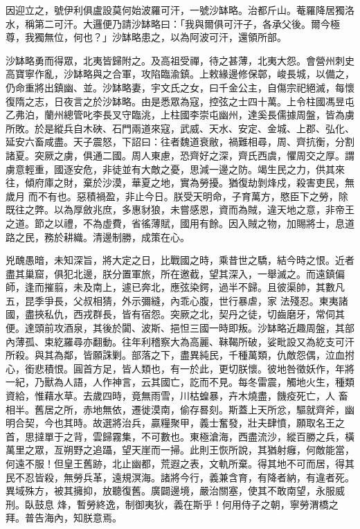\begin{pinyinscope}
 因迎立之，號伊利俱盧設莫何始波羅可汗，一號沙缽略。治都斤山。菴羅降居獨洛水，稱第二可汗。大邏便乃請沙缽略曰：「我與爾俱可汗子，各承父後。爾今極尊，我獨無位，何也？」沙缽略患之，以為阿波可汗，還領所部。



 沙缽略勇而得眾，北夷皆歸附之。及高祖受禪，待之甚薄，北夷大怨。會營州刺史高寶寧作亂，沙缽略與之合軍，攻陷臨渝鎮。上敕緣邊修保鄣，峻長城，以備之，仍命重將出鎮幽、並。沙缽略妻，宇文氏之女，曰千金公主，自傷宗祀絕滅，每懷
 復隋之志，日夜言之於沙缽略。由是悉眾為寇，控弦之士四十萬。上令柱國馮昱屯乙弗泊，蘭州總管叱李長叉守臨洮，上柱國李崇屯幽州，達奚長儒據周盤，皆為虜所敗。於是縱兵自木硤、石門兩道來寇，武威、天水、安定、金城、上郡、弘化、延安六畜咸盡。天子震怒，下詔曰：往者魏道衰敝，禍難相尋，周、齊抗衡，分割諸夏。突厥之虜，俱通二國。周人東慮，恐齊好之深，齊氏西虞，懼周交之厚。謂虜意輕重，國逐安危，非徒並有大敵之憂，思減一邊之防。竭生民之力，供其來往，傾府庫之財，棄於沙漠，華夏之地，實為勞擾。猶復劫剝烽戍，殺害吏民，無歲月
 而不有也。惡積禍盈，非止今日。朕受天明命，子育萬方，愍臣下之勞，除既往之弊。以為厚斂兆庶，多惠豺狼，未嘗感恩，資而為賊，違天地之意，非帝王之道。節之以禮，不為虛費，省徭薄賦，國用有餘。因入賊之物，加賜將士，息道路之民，務於耕織。清邊制勝，成策在心。



 兇醜愚暗，未知深旨，將大定之日，比戰國之時，乘昔世之驕，結今時之恨。近者盡其巢窟，俱犯北邊，朕分置軍旅，所在邀截，望其深入，一舉滅之。而遠鎮偏師，逢而摧翦，未及南上，遽已奔北，應弦染鍔，過半不歸。且彼渠帥，其數凡五，昆季爭長，父叔相猜，外示彌縫，內乖心腹，世行暴虐，家
 法殘忍。東夷諸國，盡挾私仇，西戎群長，皆有宿怨。突厥之北，契丹之徒，切齒磨牙，常伺其便。達頭前攻酒泉，其後於闐、波斯、挹怛三國一時即叛。沙缽略近趣周盤，其部內薄孤、束紇羅尋亦翻動。往年利稽察大為高麗、靺鞨所破，娑毗設又為紇支可汗所殺。與其為鄰，皆願誅剿。部落之下，盡異純民，千種萬類，仇敵怨偶，泣血拊心，銜悲積恨。圓首方足，皆人類也，有一於此，更切朕懷。彼地咎徵妖作，年將一紀，乃獸為人語，人作神言，云其國亡，訖而不見。每冬雷震，觸地火生，種類資給，惟藉水草。去歲四時，竟無雨雪，川枯蝗暴，卉木燒盡，饑疫死亡，人
 畜相半。舊居之所，赤地無依，遷徙漠南，偷存晷刻。斯蓋上天所忿，驅就齊斧，幽明合契，今也其時。故選將治兵，贏糧聚甲，義士奮發，壯夫肆憤，願取名王之首，思撻單于之背，雲歸霧集，不可數也。東極滄海，西盡流沙，縱百勝之兵，橫萬里之眾，亙朔野之追躡，望天崖而一掃。此則王恢所說，其猶射癰，何敵能當，何遠不服！但皇王舊跡，北止幽都，荒遐之表，文軌所棄。得其地不可而居，得其民不忍皆殺，無勞兵革，遠規溟海。諸將今行，義兼含育，有降者納，有違者死。異域殊方，被其擁抑，放聽復舊。廣闢邊境，嚴治關塞，使其不敢南望，永服威刑。臥鼓息
 烽，暫勞終逸，制御夷狄，義在斯乎！何用侍子之朝，寧勞渭橋之拜。普告海內，知朕意焉。




\end{pinyinscope}
